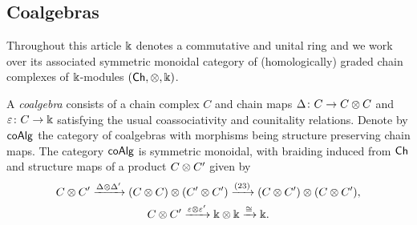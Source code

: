 
%




\subsection{Coalgebras}\label{ss:coalgebras}

Throughout this article $\Bbbk$ denotes a commutative and unital ring and we work over its associated symmetric monoidal category of (homologically) graded chain complexes of $\Bbbk$-modules $(\mathsf{Ch}, \otimes, \Bbbk)$.

A \textit{coalgebra} consists of a chain complex $C$ and chain maps $\Delta \colon C \to C \otimes C$ and $\varepsilon \colon C \to \Bbbk$ satisfying the usual coassociativity and counitality relations.
Denote by $\mathsf{coAlg}$ the category of coalgebras with morphisms being structure preserving chain maps.
The category $\mathsf{coAlg}$ is symmetric monoidal, with braiding induced from $\mathsf{Ch}$ and structure maps of a product $C \otimes C^\prime$ given by
\begin{gather*}
	C \otimes C^\prime \xrightarrow{\Delta \otimes \Delta^\prime}
	(C \otimes C) \otimes (C^\prime \otimes C^\prime) \xrightarrow{(23)}
	(C \otimes C^\prime) \otimes (C \otimes C^\prime), \\
	C \otimes C^\prime \xrightarrow{\varepsilon \otimes \varepsilon^\prime}
	\Bbbk \otimes \Bbbk \xrightarrow{\cong} \Bbbk.
\end{gather*}

